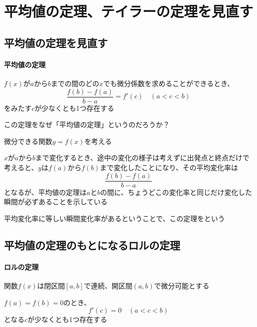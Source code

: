 \documentclass[../book_infinite_continuous_math]{subfiles}
\begin{document}
\section{平均値の定理、テイラーの定理を見直す}

\subsection{平均値の定理を見直す}

\begin{oframed}
  \paragraph{平均値の定理}
  $f(x)$が$a$から$b$までの間のどの$x$でも微分係数を求めることができるとき、
  \begin{equation*}
    \frac{f(b) - f(a)}{b - a} = f'(c) \quad (a < c < b)
  \end{equation*}
  をみたす$c$が少なくとも1つ存在する
\end{oframed}

この定理をなぜ「平均値の定理」というのだろうか？

微分できる関数$y=f(x)$を考える

$x$が$a$から$b$まで変化するとき、途中の変化の様子は考えずに出発点と終点だけで考えると、$y$は$f(a)$から$f(b)$まで変化したことになり、その平均変化率は
\begin{equation*}
  \frac{f(b) - f(a)}{b - a}
\end{equation*}
となるが、平均値の定理は$a$と$b$の間に、ちょうどこの変化率と同じだけ変化した瞬間が必ずあることを示している

平均変化率に等しい瞬間変化率があるということで、この定理をという

\sectionline
\subsection{平均値の定理のもとになるロルの定理}

\begin{oframed}
  \paragraph{ロルの定理}
  関数$f(x)$は閉区間$[a, b]$で連続、開区間$(a, b)$で微分可能とする

  $f(a) = f(b)=0$のとき、
  \begin{equation*}
    f'(c) = 0 \quad (a < c < b)
  \end{equation*}
  となる$c$が少なくとも1つ存在する
\end{oframed}
\end{document}
